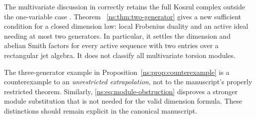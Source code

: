 The multivariate discussion in
 correctly retains the full Koszul
complex outside the one-variable case \cite{repoJets}. Theorem~
\ref{ns:thm:two-generator} gives a new sufficient condition for a closed
dimension law: local Frobenius duality and an active ideal needing at most
two generators. In particular, it settles the dimension and abelian Smith
factors for every active sequence with two entries over a rectangular jet
algebra. It does not classify all multivariate torsion modules.

The three-generator example in Proposition~\ref{ns:prop:counterexample}
is a counterexample to an \emph{unrestricted extrapolation}, not to the
manuscript's properly restricted theorem. Similarly,
\eqref{ns:eq:module-obstruction} disproves a stronger module substitution
that is not needed for the valid dimension formula. These distinctions
should remain explicit in the canonical manuscript.

